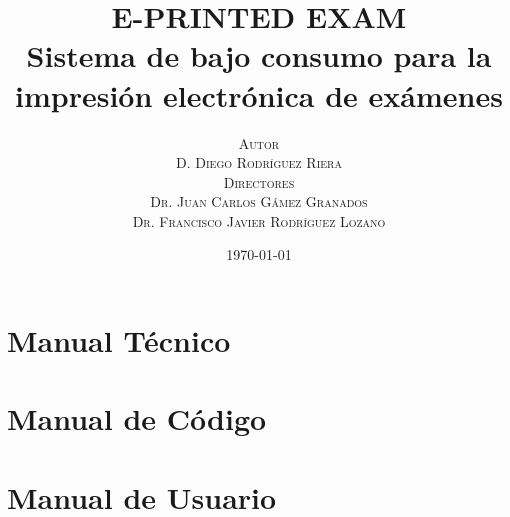 \documentclass[a4paper,onecolumn]{book}
\title{E-PRINTED EXAM\\Sistema de bajo consumo para la impresión electrónica de exámenes}
\date{\today}
\author{
    \textsc{Autor} \vspace{0.5cm}\\
    \textsc{D. Diego Rodríguez Riera} \vspace{1cm}\\
    \textsc{Directores} \vspace{0.5cm}\\
    \textsc{Dr. Juan Carlos G\'amez Granados}\\
    \textsc{Dr. Francisco Javier Rodr\'iguez Lozano}\vspace{1cm}\\
}
\begin{document}
\pagenumbering{}
\maketitle
\pagebreak
{}
\tableofcontents
\pagebreak
\listoffigures
\pagebreak
{}

\part{Manual Técnico}










\part{Manual de Código}



\part{Manual de Usuario}



\pagebreak
\printbibliography
\end{document}
